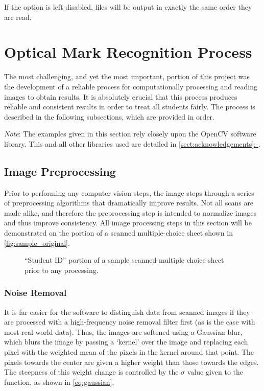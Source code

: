 \documentclass[12pt, letterpaper]{report}
\newcommand*{\sectref}[1]{\hypersetup{linkcolor=usfgreen}\hyperref[{#1}]{\ref*{#1}: \nameref*{#1}}}
\newcommand*{\itemref}[1]{\hypersetup{linkcolor=usfgreen}\hyperref[{#1}]{\autoref*{#1}}}
\newcommand*{\boxedimage}[1]{\fbox{\texttt{[image: img/\#1]}}}
\newcommand{\fig}[3]{
  \begin{figure}[h]
    \caption{#1}
    \label{#3}
    \centering
    \boxedimage{#2}
  \end{figure}
}
\begin{document}
If the option is left disabled, files will be output in exactly the same order
they are read.

\section{Optical Mark Recognition Process}
\label{sect:process}
The most challenging, and yet the most important, portion of this project was
the development of a reliable process for computationally processing and reading
images to obtain results. It is absolutely crucial that this process produces
reliable and consistent results in order to treat all students fairly. The
process is described in the following subsections, which are provided in order.

\textit{Note}: The examples given in this section rely closely upon the OpenCV
software library. This and all other libraries used are detailed in
\sectref{sect:acknowledgements}. 

\subsection{Image Preprocessing}
Prior to performing any computer vision steps, the image steps through a series
of preprocessing algorithms that dramatically improve results. Not all scans
are made alike, and therefore the preprocessing step is intended to normalize
images and thus improve consistency. All image processing steps in this section
will be demonstrated on the portion of a scanned multiple-choice sheet shown in
\itemref{fig:sample_original}.

\fig{``Student ID'' portion of a sample scanned-multiple choice sheet prior to any processing.}{sample/original.jpg}{fig:sample_original}

\subsubsection{Noise Removal}
It is far easier for the software to distinguish data from scanned images if
they are processed with a high-frequency noise removal filter first (as is the
case with most real-world data). Thus, the images are softened using a Gaussian
blur, which blurs the image by passing a `kernel' over the image and
replacing each pixel with the weighted mean of the pixels in the kernel around
that point. The pixels towards the center are given a higher weight than those
towards the edges. The steepness of this weight change is controlled by the
$\sigma$ value given to the function, as shown in \itemref{eq:gaussian}.
\end{document}
